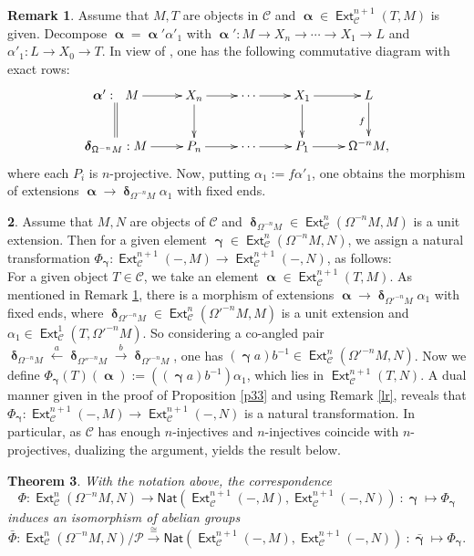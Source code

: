 \documentclass[11pt,a4paper]{amsart}
\newcommand{\rt}{\rightarrow}
\newcommand{\lrt}{\longrightarrow}
\newcommand{\lf}{\leftarrow}
\newcommand{\st}{\stackrel}
\newcommand{\C}{\mathscr{C} }
\newcommand{\p}{\mathfrak{p} }
\def\Ext{\operatorname{{\mathsf{Ext}}}}
\def\syz{\mathsf{\Omega}}
\def\p{\mathcal P}
\def\al{\operatorname{\boldsymbol{\alpha}}}
\def\ga{\operatorname{\boldsymbol{\gamma}}}
\def\de{\operatorname{\boldsymbol{\delta}}}
\newcommand{\nat}{{\mathsf{Nat}}}
\newtheorem{theorem}{Theorem}[section]
\theoremstyle{definition}
\newtheorem{rem}[theorem]{Remark}
\newtheorem{s}[theorem]{}
\theoremstyle{plain}
\theoremstyle{definition}
\numberwithin{equation}{section}
\begin{document}
\begin{rem}\label{rr}Assume that $M, T$ are objects in $\C$ and $\al\in\Ext^{n+1}_{\C}(T, M)$ is given. Decompose $\al=\al'\alpha'_1$ with $\al':M\rt X_n\rt\cdots\rt X_1\rt L$ and $\alpha'_1:L\rt X_0\rt T$. In view of \cite[Lemma 5.2(1)]{bfss},   one has the following commutative diagram with exact rows:
{\footnotesize\[\xymatrix{\al':~~M\ar@{=}[d]\ar[r] & X_n\ar[d]\ar[r] & \cdots\ar[r] & X_1\ar[r]\ar[d] & L\ar[d]_{f}\\ \de_{\syz^{-n}M}:M\ar[r] & P_{n}\ar[r] & \cdots\ar[r] & P_1\ar[r] & \syz^{-n}M,}\]}where each $P_i$ is $n$-projective. Now, putting $\alpha_1:=f\alpha'_1$, one obtains the morphism of extensions $\al\lrt\de_{\syz^{-n}M}\alpha_1$ with fixed ends.
\end{rem}

\begin{s}\label{cov}Assume that $M, N$ are objects of $\C$ and $\de_{\syz^{-n}M}\in\Ext^n_{\C}(\syz^{-n}M, M)$ is a unit extension. Then for a given element $\ga\in\Ext^n_{\C}(\syz^{-n}M, N)$, we assign a natural transformation $\Phi_{\ga}:\Ext^{n+1}_{\C}(-, M)\lrt\Ext^{n+1}_{\C}(-, N)$,  as follows:\\ For a given object $T\in\C$, we take an element $\al\in\Ext^{n+1}_{\C}(T, M)$. As mentioned in Remark \ref{rr}, there is a morphism of extensions $\al\lrt\de_{{\syz'}^{-n}M}\alpha_1$ with fixed ends, where $\de_{{\syz'}^{-n}M}\in\Ext^n_{\C}({\syz'}^{-n}M, M)$ is a unit extension and $\alpha_1\in\Ext^1_{\C}(T, {\syz'}^{-n}M)$. So considering a co-angled pair $\de_{\syz^{-n}M}\st{a}\lf\de_{{\syz''}^{-n}M}\st{b}\rt\de_{{\syz'}^{-n}M}$, one has $(\ga a)b^{-1}\in\Ext^n_{\C}({\syz'}^{-n}M, N)$. Now we define $\Phi_{\ga}(T)(\al):=((\ga a)b^{-1})\alpha_1$, which lies in $\Ext^{n+1}_{\C}(T, N)$. A dual manner given in the proof of Proposition \ref{p33} and using Remark \ref{lr}, reveals that $\Phi_{\ga}:\Ext^{n+1}_{\C}(-, M)\lrt\Ext^{n+1}_{\C}(-, N)$ is a natural transformation.  In particular, as $\C$ has enough $n$-injectives and $n$-injectives coincide with $n$-projectives,   dualizing the argument, yields the result below.
\end{s}

\begin{theorem}\label{th3}With the notation above, the correspondence
$$\Phi:\Ext^n_{\C}(\syz^{-n}M, N)\lrt\nat(\Ext^{n+1}_{\C}(-, M), \Ext^{n+1}_{\C}(-, N))~:\ga\mapsto\Phi_{\ga}$$ induces an isomorphism of abelian groups
$$\bar{\Phi}:\Ext^n_{\C}(\syz^{-n}M, N)/{\p}\st{\cong}\lrt\nat(\Ext^{n+1}_{\C}(-, M), \Ext^{n+1}_{\C}(-, N))~:\bar{\ga}\mapsto\Phi_{\ga}.$$ 
\end{theorem}
\end{document}
